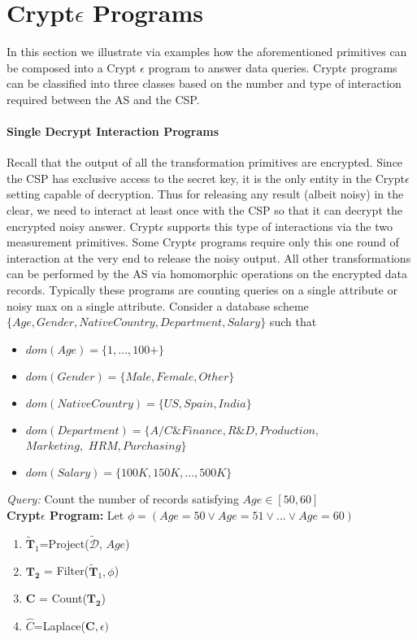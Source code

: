 \section{Crypt$\epsilon$ Programs}\label{program}
In this section we illustrate via examples how the aforementioned primitives can be composed into a Crypt $\epsilon$ program to answer data queries.
Crypt$\epsilon$ programs can be classified into three classes based on the number and type of interaction required between the \textsf{AS} and the \textsf{CSP}.
\paragraph{\textbf{Single Decrypt Interaction Programs}}
Recall that the output of all the transformation primitives are encrypted.  Since  the \textsf{CSP} has exclusive access to the secret key, it is the only entity in the Crypt$\epsilon$ setting capable of decryption. Thus for releasing any result (albeit noisy) in the clear, we need to interact at least once with the \textsf{CSP} so that it can decrypt the encrypted noisy answer. Crypt$\epsilon$ supports this type of interactions via the two measurement primitives. Some Crypt$\epsilon$ programs require only this one round of interaction at the very end to release the noisy output. All other transformations can be performed by the \textsf{AS} via homomorphic operations on the encrypted data records. Typically these programs are counting queries on a single attribute or noisy max on a single attribute. 
Consider a database scheme $\{Age, Gender, NativeCountry, Department, Salary\}$ such that \begin{itemize}\item $dom(Age)=\{1,\ldots,100+\}$  \item $dom(Gender)=\{Male, Female, Other\}$\item $dom(NativeCountry)=\{US,Spain,India\}$ \item $dom(Department)=\{A/C \& Finance, R\&D, Production,$\\$ Marketing,$ $HRM, Purchasing \}$ \item $dom(Salary)=\{100K,150K,...,500K\}$ \end{itemize} 
\begin{exmp}
\textit{Query: } Count the number of records satisfying $Age \in [50,60]$\\
\textbf{Crypt$\epsilon$ Program:}
Let $\phi=(Age=50 \vee Age=51 \vee ... \vee Age=60)$ \end{exmp}
\begin{enumerate} \item $\mathbf{\tilde{T}}_1$=\textsf{Project}($\boldsymbol{\tilde{\mathcal{D}}}$, $Age$)  \item  $\mathbf{T_2}$ = \textsf{Filter}($\mathbf{\tilde{T}}_1,\phi$)\item $\mathbf{C}$ = \textsf{Count}($\mathbf{T_2}$) \item $\hat{C}$=\textsf{Laplace}($\mathbf{C},\epsilon)$\end{enumerate}



